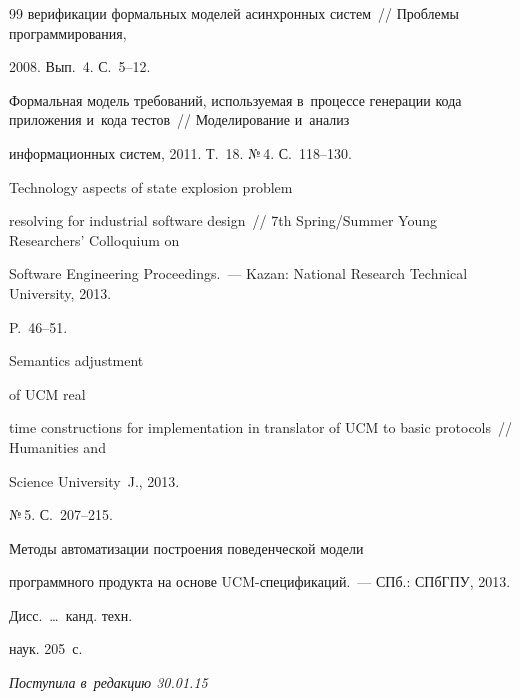 {{\begin{thebibliography}{99}
верификации формальных моделей асинхронных сис\-тем~/\!\!/ Проблемы программирования,

2008. Вып.~4. С.~5--12.


   Формальная модель требований, используемая в~процессе генерации кода приложения и~кода тестов~/\!\!/ Моделирование и~анализ

информационных систем, 2011. Т.~18. №\,4. С.~118--130.


   Technology aspects of state explosion problem

resolving for industrial software design~/\!\!/  7th Spring/Summer Young Researchers' Colloquium on

Software Engineering Proceedings.~--- Kazan: National Research Technical University, 2013.

P.~46--51.


   Semantics adjustment

  of UCM real

time constructions for implementation in translator of UCM to basic protocols~/\!\!/ Humanities and

Science University~J., 2013.

№\,5. С.~207--215.


   Методы автоматизации построения поведенческой модели

программного продукта на основе UCM-спе\-ци\-фи\-ка\-ций.~--- СПб.: СПбГПУ, 2013.

 Дисс.\ \ldots\ канд. техн.

наук. 205~с.

\end{thebibliography}

} }





\vspace*{-6pt}



\hfill{\small\textit{Поступила в~редакцию 30.01.15}}





\vspace*{9pt}



